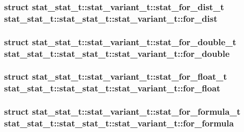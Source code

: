 \subsubsection[{for\_\-dist}]{\setlength{\rightskip}{0pt plus 5cm}struct {\bf stat\_\-stat\_\-t::stat\_\-variant\_\-t::stat\_\-for\_\-dist\_\-t}  stat\_\-stat\_\-t::stat\_\-stat\_\-t::stat\_\-variant\_\-t::for\_\-dist}\label{unionstat__stat__t_1_1stat__variant__t_a51aa61f39ce367c54e7f4fdb6d8601f}


\subsubsection[{for\_\-double}]{\setlength{\rightskip}{0pt plus 5cm}struct {\bf stat\_\-stat\_\-t::stat\_\-variant\_\-t::stat\_\-for\_\-double\_\-t}  stat\_\-stat\_\-t::stat\_\-stat\_\-t::stat\_\-variant\_\-t::for\_\-double}\label{unionstat__stat__t_1_1stat__variant__t_62e3839dbb8f83bf015c9168c76db058}


\subsubsection[{for\_\-float}]{\setlength{\rightskip}{0pt plus 5cm}struct {\bf stat\_\-stat\_\-t::stat\_\-variant\_\-t::stat\_\-for\_\-float\_\-t}  stat\_\-stat\_\-t::stat\_\-stat\_\-t::stat\_\-variant\_\-t::for\_\-float}\label{unionstat__stat__t_1_1stat__variant__t_203abff22707b7e880b4b65f75888c0b}


\subsubsection[{for\_\-formula}]{\setlength{\rightskip}{0pt plus 5cm}struct {\bf stat\_\-stat\_\-t::stat\_\-variant\_\-t::stat\_\-for\_\-formula\_\-t}  stat\_\-stat\_\-t::stat\_\-stat\_\-t::stat\_\-variant\_\-t::for\_\-formula}\label{unionstat__stat__t_1_1stat__variant__t_92203435c1cd730ade85aad02335d3c9}


